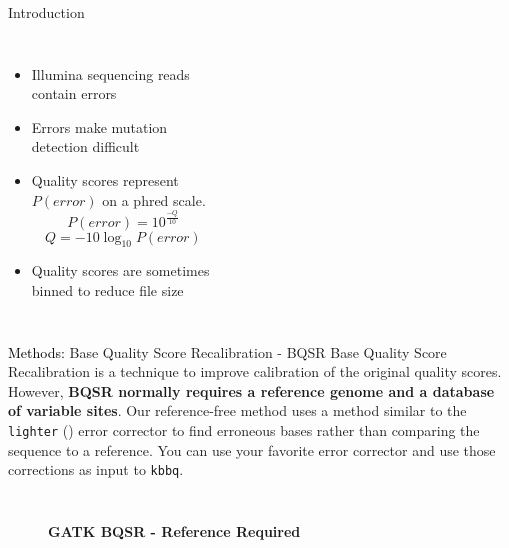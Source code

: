 \documentclass{beamer}
\begin{document}
\begin{frame}{}
\begin{columns}[T]
\begin{column}[T]{.5\linewidth}
\begin{block}{Introduction}
\begin{columns}
\begin{itemize}
\item Illumina sequencing reads contain errors
\item Errors make mutation detection difficult
\item Quality scores represent $P(error)$ on a phred scale.
\begin{displaymath}
P(error) = 10^{\frac{-Q}{10}}
\end{displaymath}
\begin{displaymath}
Q = -10\log_{10}{P(error)}
\end{displaymath}
\item Quality scores are sometimes binned to reduce file size
\end{itemize}
\begin{tabular}{l l r} \toprule

\end{tabular}
\end{columns}
\end{block}

\begin{block}{\textcolor{black}{Methods:} Base Quality Score Recalibration - BQSR}
Base Quality Score Recalibration is a technique to improve calibration of the original quality scores.
However, \textbf{BQSR normally requires a reference genome and a database of variable sites}.
Our reference-free method uses a method similar to the \texttt{lighter} (\cite{lighter}) error corrector to find erroneous bases rather than comparing the sequence to a reference. You can use your favorite error corrector and use those corrections as input to \texttt{kbbq}.

\begin{columns}
\begin{figure}
\begin{center}

\textbf{GATK BQSR - Reference Required}


\end{center}
\end{figure}
\end{columns}
\end{block}
\end{column}
\end{columns}
\end{frame}
\end{document}

